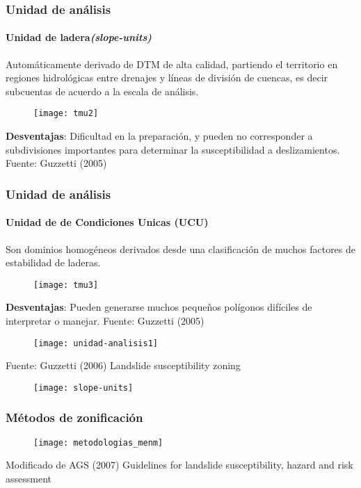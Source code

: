 \documentclass[12pt]{beamer}
\begin{document}
\begin{frame}
\frametitle{Unidad de análisis}
\framesubtitle{Unidad de ladera\emph{(slope-units)}}
\scriptsize{
Automáticamente derivado de DTM de alta calidad, partiendo el territorio en regiones hidrológicas entre drenajes y líneas de división de cuencas, es decir subcuentas de acuerdo a la escala de análisis.
}
\begin{figure}
\centering
\texttt{[image: tmu2]} 
\end{figure}
\scriptsize{\textbf{Desventajas}: Dificultad en la preparación, y pueden no corresponder a subdivisiones importantes para determinar la susceptibilidad a deslizamientos.}
\vfill
\tiny{Fuente: Guzzetti (2005)}
\end{frame}
\begin{frame}
\frametitle{Unidad de análisis}
\framesubtitle{Unidad de de Condiciones Unicas (UCU)}
\scriptsize{
Son dominios homogéneos derivados desde una clasificación de muchos factores de estabilidad de laderas.
}
\begin{figure}
\centering
\texttt{[image: tmu3]} 
\end{figure}
\scriptsize{\textbf{Desventajas}: Pueden generarse muchos pequeños polígonos difíciles de interpretar o manejar.
}
\vfill
\tiny{Fuente: Guzzetti (2005)}
\end{frame}
\begin{frame}
\begin{figure}
\centering
\texttt{[image: unidad-analisis1]} 
\end{figure}
\tiny{Fuente: Guzzetti (2006) Landslide susceptibility zoning }
\end{frame}
\begin{frame}
\begin{figure}
\centering
\texttt{[image: slope-units]} 
\end{figure}
\end{frame}
\begin{frame}
\frametitle{Métodos de zonificación}
\begin{figure}
\centering
\texttt{[image: metodologias\_menm]} 
\end{figure}
\tiny{Modificado de AGS (2007) Guidelines for landslide susceptibility, hazard and risk assessment}
\end{frame}
\end{document}
